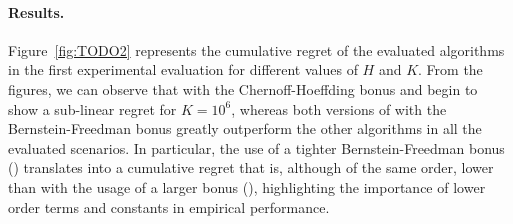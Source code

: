 



\paragraph{Results.}
Figure~\ref{fig:TODO2} represents the cumulative regret of the evaluated algorithms in the first experimental evaluation for different values of $H$ and $K$. From the figures, we can observe that \ucbvi with the Chernoff-Hoeffding bonus and \mvp begin to show a sub-linear regret for $K=10^6$, whereas both versions of \ucbvi with the Bernstein-Freedman bonus greatly outperform the other algorithms in all the evaluated scenarios. In particular, the use of a tighter Bernstein-Freedman bonus (\ucbvibfi) translates into a cumulative regret that is, although of the same order, lower than with the usage of a larger bonus (\ucbvibf), highlighting the importance of lower order terms and constants in empirical performance.

